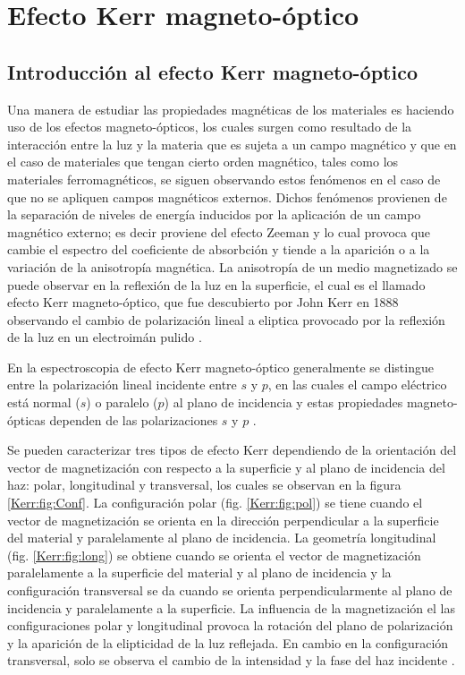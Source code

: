 \chapter{Efecto Kerr magneto-\'optico} \label{cap:Kerr}
\section{Introducci\'on al efecto Kerr magneto-\'optico} \label{Kerr:sec:Intr}
Una manera de estudiar las propiedades magn\'eticas de los materiales es haciendo uso de los efectos magneto-\'opticos, los cuales surgen como resultado de la interacci\'on entre la luz y la materia que es sujeta a un campo magn\'etico y que en el caso de materiales que tengan cierto orden magn\'etico, tales como los materiales ferromagn\'eticos, se siguen observando estos fen\'omenos en el caso de que no se apliquen campos magn\'eticos externos. Dichos fen\'omenos provienen de la separaci\'on de niveles de energ\'ia inducidos por la aplicaci\'on de un campo magn\'etico externo; es decir proviene del efecto Zeeman y lo cual provoca que cambie el espectro del coeficiente de  absorbci\'on y tiende a la aparici\'on o a la variaci\'on de la anisotropía magn\'etica. La anisotrop\'ia de un medio magnetizado se puede observar en la reflexi\'on de la luz en la superficie, el cual es el llamado efecto Kerr magneto-\'optico, que fue descubierto por  John Kerr en 1888 observando el cambio de polarizaci\'on  lineal a eliptica provocado por la reflexi\'on de la luz en un electroim\'an pulido \cite{Kerr_1888}.  
\newline
\par En la espectroscopia de efecto Kerr magneto-\'optico generalmente se distingue entre la polarizaci\'on lineal incidente entre $s$ y $p$, en las cuales el campo el\'ectrico est\'a normal ($s$) o paralelo ($p$) al plano de incidencia y estas propiedades magneto-\'opticas dependen de las polarizaciones $s$ y $p$ \cite{mo_2004}.
\newline
\par Se pueden caracterizar tres tipos de  efecto Kerr dependiendo de la orientaci\'on del vector de magnetizaci\'on con respecto a la superficie y al plano de incidencia del haz: polar, longitudinal y transversal, los cuales se observan en la figura \ref{Kerr:fig:Conf}. La configuraci\'on polar (fig. \ref{Kerr:fig:pol}) se tiene cuando el vector de magnetizaci\'on se orienta en la direcci\'on perpendicular a la superficie del material y paralelamente al plano de incidencia. La geometr\'ia longitudinal (fig. \ref{Kerr:fig:long}) se obtiene cuando se orienta el vector de magnetizaci\'on paralelamente a la superficie del material y al plano de incidencia y la configuraci\'on transversal se da cuando se orienta perpendicularmente al plano de incidencia y  paralelamente a la superficie.  La influencia de la magnetizaci\'on el las configuraciones polar  y longitudinal provoca la rotaci\'on del plano de polarizaci\'on y la aparici\'on de  la elipticidad de la luz reflejada. En cambio en la configuraci\'on transversal, solo se observa el cambio de la intensidad y la fase del haz incidente \cite{mo_2004}.
